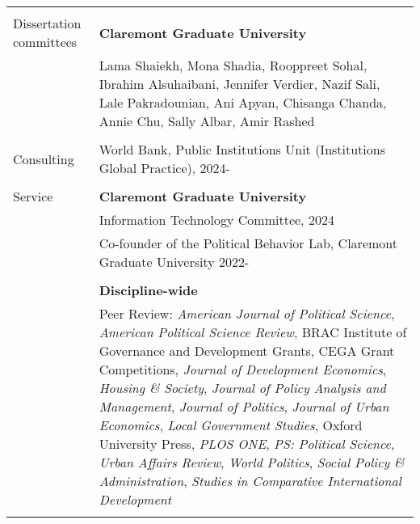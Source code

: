 \documentclass[letterpaper, 10.5pt]{article}
\begin{document}
\begin{longtable}{p{1.5in}p{5in}}
&\\

%
%
%


{{Dissertation committees}}
& \textbf{Claremont Graduate University} \\

&Lama Shaiekh, Mona Shadia, Rooppreet Sohal, Ibrahim Alsuhaibani, Jennifer Verdier, Nazif Sali, Lale Pakradounian, Ani Apyan, Chisanga Chanda, Annie Chu, Sally Albar, Amir Rashed \\
&\\

\nohyphens{{Consulting}} & World Bank, Public Institutions Unit (Institutions Global Practice), 2024-\\

&\\


\nohyphens{{Service}} & \textbf{Claremont Graduate University} \\ & Information Technology Committee, 2024 \\
& Co-founder of the Political Behavior Lab, Claremont Graduate University 2022- \\

&\\


& \textbf{Discipline-wide} \\
&Peer Review: \textit{American Journal of Political Science}, \textit{American Political Science Review}, BRAC Institute of Governance and Development Grants, CEGA Grant Competitions, \textit{Journal of Development Economics}, \textit{Housing \& Society},
\textit{Journal of Policy Analysis and Management}, \textit{Journal of Politics}, \textit{Journal of Urban Economics}, \textit{Local Government Studies}, Oxford University Press, \textit{PLOS ONE}, \textit{PS: Political Science}, \textit{Urban Affairs Review}, \textit{World Politics}, \textit{Social Policy \& Administration}, \textit{Studies in Comparative International Development}\\ 
&\\


\end{longtable}
\end{document}
